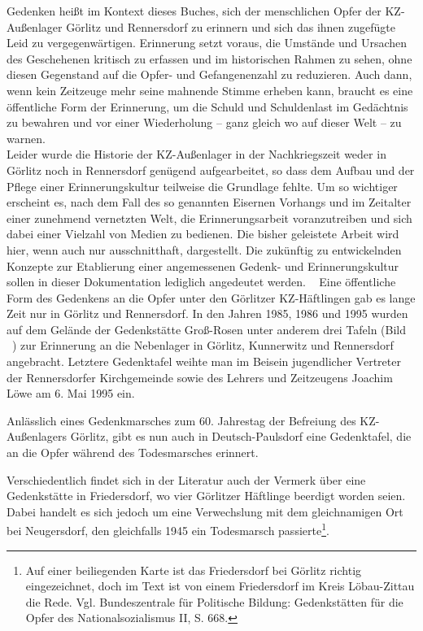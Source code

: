 
Gedenken heißt im Kontext dieses Buches, sich der menschlichen Opfer der KZ-Außenlager Görlitz und Rennersdorf zu erinnern und sich das ihnen zugefügte Leid zu vergegenwärtigen. 
Erinnerung setzt voraus, die Umstände und Ursachen des Geschehenen kritisch zu erfassen und im historischen Rahmen zu sehen, ohne diesen Gegenstand auf die Opfer- und Gefangenenzahl zu reduzieren. Auch dann, wenn kein Zeitzeuge mehr seine mahnende Stimme erheben kann, braucht es eine öffentliche Form der Erinnerung, um die Schuld und Schuldenlast im Gedächtnis zu bewahren und vor einer Wiederholung -- ganz gleich wo auf dieser Welt -- zu warnen. 
\\
Leider wurde die Historie der KZ-Außenlager in der Nachkriegszeit weder in Görlitz noch in Rennersdorf genügend aufgearbeitet, so dass dem Aufbau und der Pflege einer Erinnerungskultur teilweise die Grundlage fehlte. Um so wichtiger erscheint es, nach dem Fall des so genannten Eisernen Vorhangs und im Zeitalter einer zunehmend vernetzten Welt, die Erinnerungsarbeit voranzutreiben und sich dabei einer Vielzahl von Medien zu bedienen. Die bisher geleistete Arbeit wird hier, wenn auch nur ausschnitthaft, dargestellt. Die zukünftig zu entwickelnden Konzepte zur Etablierung einer angemessenen Gedenk- und Erinnerungskultur sollen in dieser Dokumentation lediglich angedeutet werden.
~\newline
Eine öffentliche Form des Gedenkens an die Opfer unter den Görlitzer KZ-Häftlingen gab es lange Zeit nur in Görlitz und Rennersdorf. 
In den Jahren 1985, 1986 und 1995 wurden auf dem Gelände der Gedenkstätte Groß-Rosen unter anderem drei Tafeln (Bild ~) zur Erinnerung an die Nebenlager in Görlitz, Kunnerwitz und Rennersdorf angebracht. Letztere Gedenktafel weihte man im Beisein jugendlicher Vertreter der Rennersdorfer Kirchgemeinde sowie des Lehrers und Zeitzeugens Joachim Löwe am 6. Mai 1995 ein.\newline

Anlässlich eines Gedenkmarsches zum 60. Jahrestag der Befreiung des KZ-Außenlagers Görlitz, gibt es nun auch in Deutsch-Paulsdorf eine Gedenktafel, die an die Opfer während des Todesmarsches erinnert.\newline

Verschiedentlich findet sich in der Literatur auch der Vermerk über eine Gedenkstätte in Friedersdorf, wo vier Görlitzer Häftlinge beerdigt worden seien. Dabei handelt es sich jedoch um eine Verwechslung mit dem gleichnamigen Ort bei Neugersdorf, den gleichfalls 1945 ein Todesmarsch passierte\footnote{Auf einer beiliegenden Karte ist das Friedersdorf bei Görlitz richtig eingezeichnet, doch im Text ist von einem Friedersdorf im Kreis Löbau-Zittau die Rede. Vgl. Bundeszentrale für Politische Bildung: Gedenkstätten für die Opfer des Nationalsozialismus II, S. 668.}.


